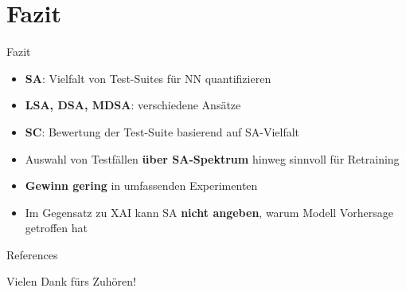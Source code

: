 \documentclass[usenames, dvipsnames, aspectratio=32]{beamer}
\begin{document}
\section{Fazit}

\begin{frame}[allowframebreaks]{Fazit}
    \begin{itemize}
        \item \textbf{SA}: Vielfalt von Test-Suites für NN quantifizieren
        \item \textbf{LSA, DSA, MDSA}: verschiedene Ansätze %
        \item \textbf{SC}: Bewertung der Test-Suite basierend auf SA-Vielfalt
    \end{itemize}
    \framebreak
    \begin{itemize}
        \item Auswahl von Testfällen \textbf{über SA-Spektrum} hinweg sinnvoll für Retraining \cite{sa_1}
        \item \textbf{Gewinn gering} in umfassenden Experimenten \cite{sa_2} %
        \item Im Gegensatz zu XAI kann SA \textbf{nicht angeben}, warum Modell Vorhersage getroffen hat
    \end{itemize}
\end{frame}

\appendix
{}
\begin{frame}{References}
    \printbibliography[heading=none]
\end{frame}

\begin{frame}
    \centering
    \vspace{1em}
    \huge \textcolor{Black!80}{Vielen Dank fürs Zuhören!}
\end{frame}
\end{document}
